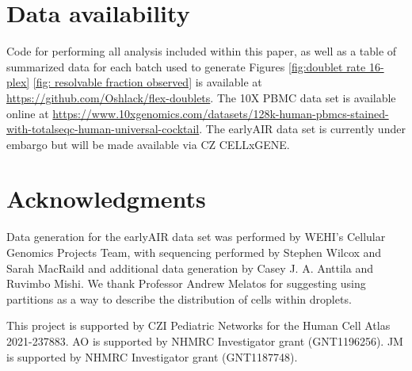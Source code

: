 \documentclass[unnumsec,webpdf,modern,large]{oup-authoring-template}
\begin{document}
	
	
	\section{Data availability}
	\label{sec:data availability}
	
	Code for performing all analysis included within this paper, as well as a table of summarized data for each batch used to generate Figures \ref{fig:doublet rate 16-plex} \ref{fig: resolvable fraction observed} is available at \url{https://github.com/Oshlack/flex-doublets}.
	The 10X PBMC data set is available online at \url{https://www.10xgenomics.com/datasets/128k-human-pbmcs-stained-with-totalseqc-human-universal-cocktail}. 
	The earlyAIR data set is currently under embargo but will be made available via CZ CELLxGENE. 
		
	\section{Acknowledgments}
	\label{acknowledgements}
	
	Data generation for the earlyAIR data set was performed by WEHI’s Cellular Genomics Projects Team, with sequencing performed by Stephen Wilcox and Sarah MacRaild and additional data generation by Casey J. A. Anttila and Ruvimbo Mishi.
	We thank Professor Andrew Melatos for suggesting using partitions as a way to describe the distribution of cells within droplets. 
	
	This project is supported by CZI Pediatric Networks for the Human Cell Atlas 2021-237883.
	AO is supported by NHMRC Investigator grant (GNT1196256). 
	JM is supported by NHMRC Investigator grant (GNT1187748). 
	
	
	
	 
	
	
	
	
	
\end{document}
